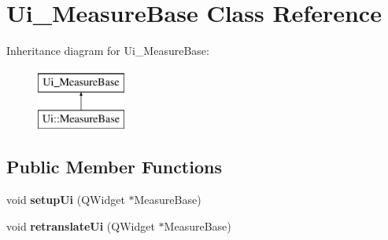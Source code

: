 \hypertarget{class_ui___measure_base}{}\section{Ui\+\_\+\+Measure\+Base Class Reference}
\label{class_ui___measure_base}
Inheritance diagram for Ui\+\_\+\+Measure\+Base\+:\begin{figure}[H]
\begin{center}
\leavevmode
\includegraphics[height=2.000000cm]{class_ui___measure_base}
\end{center}
\end{figure}
\subsection*{Public Member Functions}
\begin{DoxyCompactItemize}
\item 
\mbox{\label{class_ui___measure_base_a3151a869411a9f5115078ed37320244e}} 
void {\bfseries setup\+Ui} (Q\+Widget $\ast$Measure\+Base)
\item 
\mbox{\label{class_ui___measure_base_a80cca7b7ed4155f35ce3f1917fc4534e}} 
void {\bfseries retranslate\+Ui} (Q\+Widget $\ast$Measure\+Base)
\end{DoxyCompactItemize}
